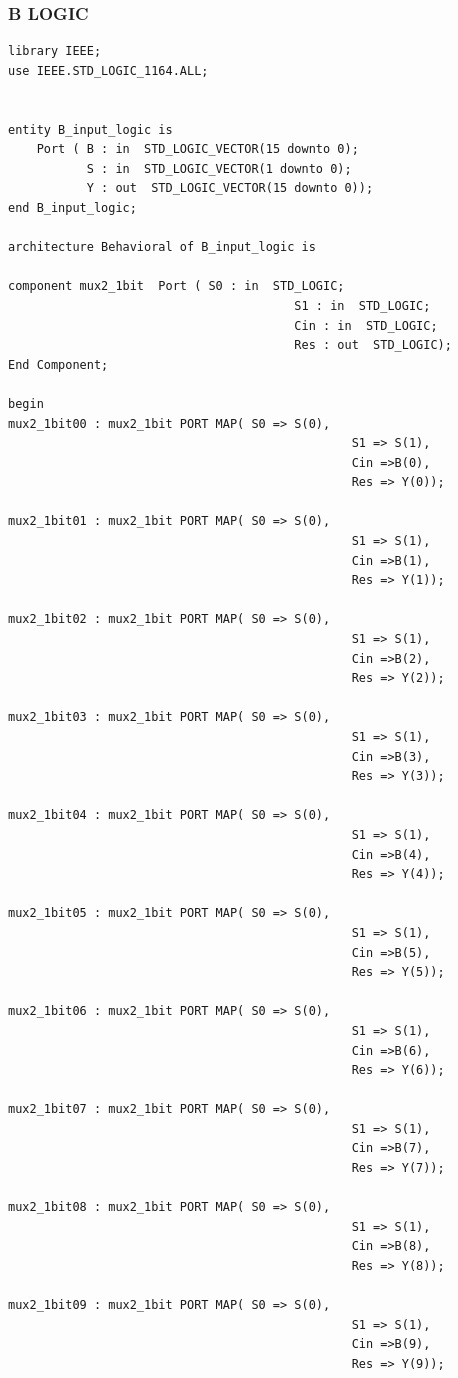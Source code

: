 \documentclass{article}
\begin{document}
\subsubsection{B LOGIC}\label{sec:result}

\begin{lstlisting}
library IEEE;
use IEEE.STD_LOGIC_1164.ALL;


entity B_input_logic is
    Port ( B : in  STD_LOGIC_VECTOR(15 downto 0);
           S : in  STD_LOGIC_VECTOR(1 downto 0);
           Y : out  STD_LOGIC_VECTOR(15 downto 0));
end B_input_logic;

architecture Behavioral of B_input_logic is

component mux2_1bit  Port ( S0 : in  STD_LOGIC;
										S1 : in  STD_LOGIC;
										Cin : in  STD_LOGIC;
										Res : out  STD_LOGIC);
End Component;

begin
mux2_1bit00 : mux2_1bit PORT MAP( S0 => S(0),
												S1 => S(1),
												Cin =>B(0),
												Res => Y(0));
					
mux2_1bit01 : mux2_1bit PORT MAP( S0 => S(0),
												S1 => S(1),
												Cin =>B(1),
												Res => Y(1));
												
mux2_1bit02 : mux2_1bit PORT MAP( S0 => S(0),
												S1 => S(1),
												Cin =>B(2),
												Res => Y(2));
					
mux2_1bit03 : mux2_1bit PORT MAP( S0 => S(0),
												S1 => S(1),
												Cin =>B(3),
												Res => Y(3));
												
mux2_1bit04 : mux2_1bit PORT MAP( S0 => S(0),
												S1 => S(1),
												Cin =>B(4),
												Res => Y(4));
					
mux2_1bit05 : mux2_1bit PORT MAP( S0 => S(0),
												S1 => S(1),
												Cin =>B(5),
												Res => Y(5));
												
mux2_1bit06 : mux2_1bit PORT MAP( S0 => S(0),
												S1 => S(1),
												Cin =>B(6),
												Res => Y(6));
					
mux2_1bit07 : mux2_1bit PORT MAP( S0 => S(0),
												S1 => S(1),
												Cin =>B(7),
												Res => Y(7));
												
mux2_1bit08 : mux2_1bit PORT MAP( S0 => S(0),
												S1 => S(1),
												Cin =>B(8),
												Res => Y(8));
					
mux2_1bit09 : mux2_1bit PORT MAP( S0 => S(0),
												S1 => S(1),
												Cin =>B(9),
												Res => Y(9));
												

\end{lstlisting}
\end{document}
